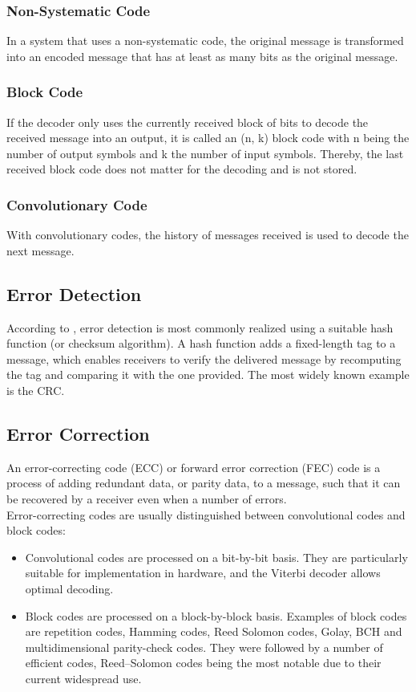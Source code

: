 \subsubsection{Non-Systematic Code}
In a system that uses a non-systematic code, the original message is transformed into an encoded message that has at least as many bits as the original message.
\subsubsection{Block Code}
If the decoder only uses the currently received block of bits to decode the received message into an output, it is called an (n, k) block code with n being the number of output symbols and k the number of input symbols. Thereby, the last received block code does not matter for the decoding and is not stored. 
\subsubsection{Convolutionary Code}
With convolutionary codes, the history of messages received is used to decode the next message.
%
%
%
\subsection{Error Detection}
According to \cite{ErrorDetectionAndCorrection_Wikipedia}, error detection is most commonly realized using a suitable hash function (or checksum algorithm). A hash function adds a fixed-length tag to a message, which enables receivers to verify the delivered message by recomputing the tag and comparing it with the one provided. The most widely known example is the CRC.
%
%
\subsection{Error Correction}
An error-correcting code (ECC) or forward error correction (FEC) code is a process of adding redundant data, or parity data, to a message, such that it can be recovered by a receiver even when a number of errors.\\
Error-correcting codes are usually distinguished between convolutional codes and block codes:
\begin{itemize}
    \item Convolutional codes are processed on a bit-by-bit basis. They are particularly suitable for implementation in hardware, and the Viterbi decoder allows optimal decoding.
    \item Block codes are processed on a block-by-block basis. Examples of block codes are repetition codes, Hamming codes, Reed Solomon codes, Golay, BCH and multidimensional parity-check codes. They were followed by a number of efficient codes, Reed–Solomon codes being the most notable due to their current widespread use.
\end{itemize}
%
%
